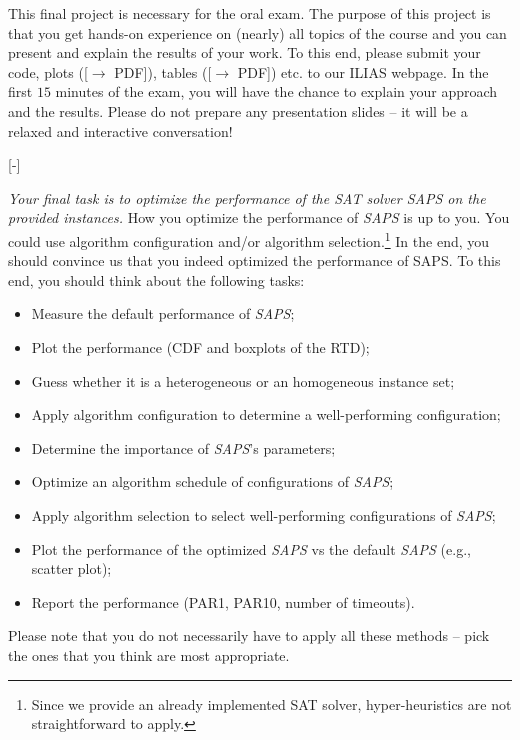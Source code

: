 \documentclass{exam}
\begin{document}
This final project is necessary for the oral exam. 
The purpose of this project is that you get hands-on experience on (nearly) all topics of the course 
and you can present and explain the results of your work. 
To this end, please submit your code, plots ([$\to$ PDF]), tables ([$\to$ PDF]) etc. to our ILIAS webpage.
In the first $15$ minutes of the exam, you will have the chance to explain your approach and the results.
Please do not prepare any presentation slides -- it will be a relaxed and interactive conversation!
  
\begin{questions}

[-]

\emph{Your final task is to optimize the performance of the SAT solver SAPS on the provided instances.}
How you optimize the performance of \textit{SAPS} is up to you. 
You could use algorithm configuration and/or algorithm selection.\footnote{Since we provide an already implemented SAT solver, hyper-heuristics are not straightforward to apply.} 
In the end, you should convince us that you indeed optimized the performance of SAPS.
To this end, you should think about the following tasks:

\begin{itemize}
  \item Measure the default performance of \textit{SAPS};
  \item Plot the performance (CDF and boxplots of the RTD);
  \item Guess whether it is a heterogeneous or an homogeneous instance set;
  \item Apply algorithm configuration to determine a well-performing configuration;
  \item Determine the importance of \textit{SAPS}'s parameters;
  \item Optimize an algorithm schedule of configurations of \textit{SAPS};
  \item Apply algorithm selection to select well-performing configurations of \textit{SAPS};
  \item Plot the performance of the optimized \textit{SAPS} vs the default \textit{SAPS} (e.g., scatter plot); 
  \item Report the performance (PAR1, PAR10, number of timeouts).
\end{itemize}

Please note that you do not necessarily have to apply all these methods -- pick the ones that you think are most appropriate.


\end{questions}
\end{document}
